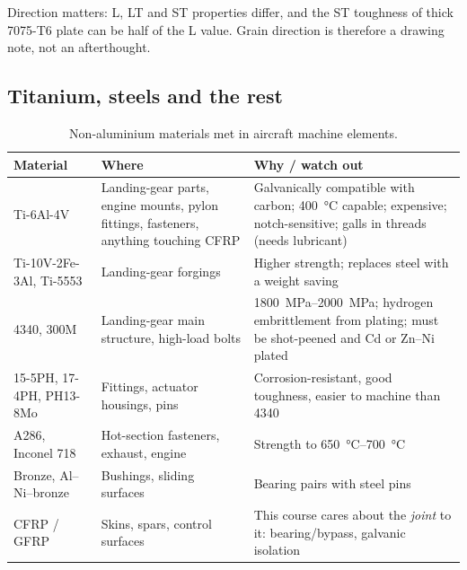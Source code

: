 \documentclass[11pt,a4paper]{article}
\begin{document}
Direction matters: L, LT and ST properties differ, and the ST toughness of thick 7075-T6 plate can be half of the L value. Grain direction is therefore a drawing note, not an afterthought.

\subsection{Titanium, steels and the rest}
\begin{table}[H]\centering\footnotesize
\begin{tabular}{@{}p{2.8cm}p{5.4cm}p{6.6cm}@{}}
\toprule
Material & Where & Why / watch out \\
\midrule
Ti-6Al-4V & Landing-gear parts, engine mounts, pylon fittings, fasteners, anything touching CFRP & Galvanically compatible with carbon; \SI{400}{\celsius} capable; expensive; notch-sensitive; galls in threads (needs lubricant) \\
Ti-10V-2Fe-3Al, Ti-5553 & Landing-gear forgings & Higher strength; replaces steel with a weight saving \\
4340, 300M & Landing-gear main structure, high-load bolts & \SIrange{1800}{2000}{MPa}; hydrogen embrittlement from plating; must be shot-peened and Cd or Zn--Ni plated \\
15-5PH, 17-4PH, PH13-8Mo & Fittings, actuator housings, pins & Corrosion-resistant, good toughness, easier to machine than 4340 \\
A286, Inconel 718 & Hot-section fasteners, exhaust, engine & Strength to \SIrange{650}{700}{\celsius} \\
Bronze, Al--Ni--bronze & Bushings, sliding surfaces & Bearing pairs with steel pins \\
CFRP / GFRP & Skins, spars, control surfaces & This course cares about the \emph{joint} to it: bearing/bypass, galvanic isolation \\
\bottomrule
\end{tabular}
\caption{Non-aluminium materials met in aircraft machine elements.}
\end{table}
\end{document}
